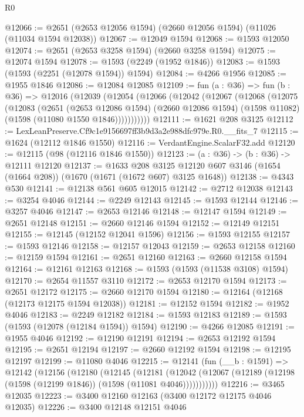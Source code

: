 \begin{lexlean}{R0}
\begin{coremodule}
@12066 := @2651 (@2653 @12056 @1594) (@2660 @12056 @1594) (@11026 (@11034 @1594 @12038))
@12067 := @12049 @1594
@12068 := @1593 @12050
@12074 := @2651 (@2653 @3258 @1594) (@2660 @3258 @1594)
@12075 := @12074 @1594
@12078 := @1593 (@2249 (@1952 @1846))
@12083 := @1593 (@1593 (@2251 (@12078 @1594)) @1594)
@12084 := @4266 @1956
@12085 := @1955 @1846
@12086 := @12084 @12085
@12109 := fun (a : @36) =>
  fun (b : @36) =>
  @12016
    (@12039
      (@12054
        (@12066
          (@12042
            (@12067
              (@12068
                (@12075
                  (@12083
                    (@2651
                      (@2653 @12086 @1594)
                      (@2660 @12086 @1594)
                      (@1598 @11082)
                      (@1598 (@11080 @1550 @1846)))))))))))
@12111 := @1621 @208 @3125
@12112 := LexLeanPreserve.Cf9c1e9156697ff3b9d3a2e988dfc979e.R0.__fits_7
@12115 := @1624 (@12112 @1846 @1550)
@12116 := VerdantEngine.ScalarF32.add
@12120 := @12115 (@98 (@12116 @1846 @1550))
@12123 := (a : @36) -> (b : @36) -> @12111 @12120
@12137 := @1633
    @208
    @3125
    @12120
    @607
    @3146
    (@1654 (@1664 @208))
    (@1670 (@1671 (@1672 @607) @3125 @1648))
@12138 := @4343 @530
@12141 := @12138 @561 @605 @12015
@12142 := @2712 @12038
@12143 := @3254 @4046
@12144 := @2249 @12143
@12145 := @1593 @12144
@12146 := @3257 @4046
@12147 := @2653 @12146
@12148 := @12147 @1594
@12149 := @2651 @12148
@12151 := @2660 @12146 @1594
@12152 := @12149 @12151
@12155 := @12145 (@12152 @12041 @1596)
@12156 := @1593 @12155
@12157 := @1593 @12146
@12158 := @12157 @12043
@12159 := @2653 @12158
@12160 := @12159 @1594
@12161 := @2651 @12160
@12163 := @2660 @12158 @1594
@12164 := @12161 @12163
@12168 := @1593 (@1593 (@11538 @3108) @1594)
@12170 := @2654 @11557 @3110
@12172 := @2653 @12170 @1594
@12173 := @2651 @12172
@12175 := @2660 @12170 @1594
@12180 := @12164 (@12168 (@12173 @12175 @1594 @12038))
@12181 := @12152 @1594
@12182 := @1952 @4046
@12183 := @2249 @12182
@12184 := @1593 @12183
@12189 := @1593 (@1593 (@12078 (@12184 @1594)) @1594)
@12190 := @4266 @12085
@12191 := @1955 @4046
@12192 := @12190 @12191
@12194 := @2653 @12192 @1594
@12195 := @2651 @12194
@12197 := @2660 @12192 @1594
@12198 := @12195 @12197
@12199 := @11080 @4046
@12215 := @12141
    (fun (__b : @1591) =>
    @12142
      (@12156
        (@12180
          (@12145
            (@12181
              (@12042 (@12067 (@12189 (@12198 (@1598 (@12199 @1846)) (@1598 (@11081 @4046)))))))))))
@12216 := @3465 @12035
@12223 := @3400 @12160 @12163 (@3400 @12172 @12175 @4046 @12035)
@12226 := @3400 @12148 @12151 @4046

\end{coremodule}
\end{lexlean}
